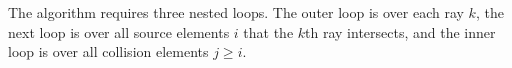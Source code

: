 The algorithm requires three nested loops. The outer loop is over each ray $k$, the next loop is over all source elements $i$ that the $k$th ray intersects, and the inner loop is over all collision elements $j \ge i$.

%
%
%




